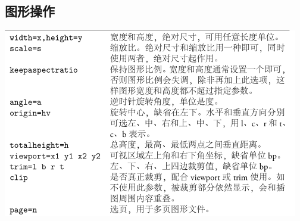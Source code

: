\documentclass[UTF8]{article}
\begin{document}
\subsection{图形操作}
\includegraphics[scale=1.0]{GraphicalOperation.png}
\end{document}
